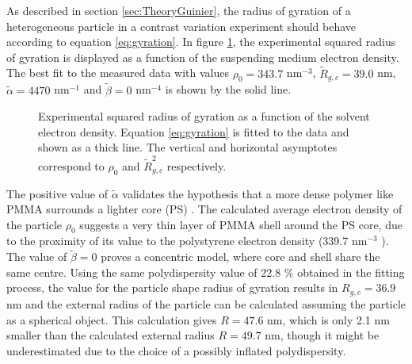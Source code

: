 As described in section \ref{sec:TheoryGuinier}, the radius of gyration of a heterogeneous particle in a contrast variation experiment should behave according to equation \eqref{eq:gyration}. In figure \ref{fig:KiskerGuinierRadius}, the experimental squared radius of gyration is displayed as a function of the suspending medium electron density. The best fit to the measured data with values \(\rho_0=343.7\) nm\(^{-3}\), \( \tilde R_{g,c}=39.0\) nm, \(\tilde \alpha=4470\) nm\(^{-1}\) and \(\tilde\beta=0\) nm\(^{-4}\) is shown by the solid line. 

\begin{figure}%
	\centering
		
		\caption[Radius of gyration of the PS-COOH particles.]{Experimental squared radius of gyration as a function of the solvent electron density. Equation \eqref{eq:gyration} is fitted to the data and shown as a thick line. The vertical and horizontal asymptotes correspond to $\rho_0$ and $\tilde R^2_{g,c}$ respectively.}
		\label{fig:KiskerGuinierRadius}
\end{figure}

The positive value of \(\tilde\alpha\) validates the hypothesis that a more dense polymer like PMMA surrounds a lighter core (PS) \citep{stuhrmann_small-angle_2008}. The calculated average electron density of the particle \(\rho_0\) suggests a very thin layer of PMMA shell around the PS core, due to the proximity of its value to the polystyrene electron density (339.7 nm\(^{-3}\) ). The value of \( \tilde\beta=0\) proves a concentric model, where core and shell share the same centre. Using the same polydispersity value of 22.8 $\%$ obtained in the fitting process, the value for the particle shape radius of gyration results in \(R_{g,c}=36.9\) nm and the external radius of the particle can be calculated assuming the particle as a spherical object. This calculation gives \( R=47.6\) nm, which is only 2.1 nm smaller than the calculated external radius \(R=49.7\) nm, though it might be underestimated due to the choice of a possibly inflated polydispersity. 

